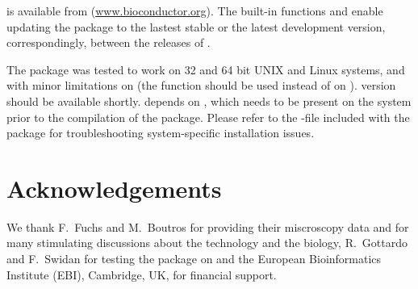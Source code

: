 is available from  (\url{www.bioconductor.org}). The built-in functions  and  enable updating the package to the lastest stable or the latest development version, correspondingly, between the releases of .

The package was tested to work on 32 and 64 bit UNIX and Linux systems, and with minor limitations on  (the  function should be used instead of  on ).  version should be available shortly.  depends on , which needs to be present on the system prior to the compilation of the package. Please refer to the -file included with the package for troubleshooting system-specific installation issues.

\section*{Acknowledgements}

We thank F.~Fuchs and M.~Boutros for providing their miscroscopy data and for many stimulating discussions about the technology and the biology, R.~Gottardo and F.~Swidan for testing the package on  and the European Bioinformatics Institute (EBI), Cambridge, UK, for financial support.

